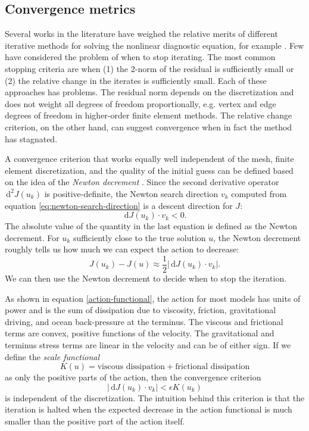 \documentclass{article}
\theoremstyle{definition}
\theoremstyle{plain}
\newcommand{\ud}{\hspace{2pt}\mathrm{d}}
\begin{document}
\subsection{Convergence metrics} \label{sec:convergence-criteria}

Several works in the literature have weighed the relative merits of different iterative methods for solving the nonlinear diagnostic equation, for example \citet{perego2012parallel}.
Few have considered the problem of when to stop iterating.
The most common stopping criteria are when (1) the 2-norm of the residual is sufficiently small or (2) the relative change in the iterates is sufficiently small.
Each of these approaches has problems.
The residual norm depends on the discretization and does not weight all degrees of freedom proportionally, e.g. vertex and edge degrees of freedom in higher-order finite element methods.
The relative change criterion, on the other hand, can suggest convergence when in fact the method has stagnated.

A convergence criterion that works equally well independent of the mesh, finite element discretization, and the quality of the initial guess can be defined based on the idea of the \emph{Newton decrement} \citep{nocedal2006numerical}.
Since the second derivative operator $\ud^2J(u_k)$ is positive-definite, the Newton search direction $v_k$ computed from equation \eqref{eq:newton-search-direction} is a descent direction for $J$:
\begin{equation}
    \ud J(u_k)\cdot v_k < 0.
\end{equation}
The absolute value of the quantity in the last equation is defined as the Newton decrement.
For $u_k$ sufficiently close to the true solution $u$, the Newton decrement roughly tells us how much we can expect the action to decrease:
\begin{equation}
    J(u_k) - J(u) \approx \frac{1}{2}|\ud J(u_k)\cdot v_k|.
\end{equation}
We can then use the Newton decrement to decide when to stop the iteration.

As shown in equation \eqref{action-functional}, the action for most models has units of power and is the sum of dissipation due to viscosity, friction, gravitational driving, and ocean back-pressure at the terminus.
The viscous and frictional terms are convex, positive functions of the velocity.
The gravitational and terminus stress terms are linear in the velocity and can be of either sign.
If we define the \emph{scale functional}
\begin{equation}
    K(u) = \text{viscous dissipation} + \text{frictional dissipation}
\end{equation}
as only the positive parts of the action, then the convergence criterion
\begin{equation}
    |\ud J(u_k)\cdot v_k| < \epsilon K(u_k)
\end{equation}
is independent of the discretization.
The intuition behind this criterion is that the iteration is halted when the expected decrease in the action functional is much smaller than the positive part of the action itself.
\end{document}
